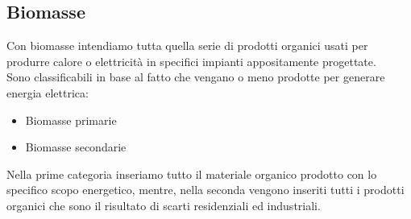\subsection{Biomasse}
Con biomasse intendiamo tutta quella serie di prodotti organici usati per produrre calore o elettricità in specifici impianti appositamente progettate.\\
Sono classificabili in base al fatto che vengano o meno prodotte per generare energia elettrica\cite{IRENA}:
\begin{itemize}
    \item Biomasse primarie
    \item Biomasse secondarie
\end{itemize}
\noindent
Nella prime categoria inseriamo tutto il materiale organico prodotto con lo specifico scopo energetico, mentre, nella seconda vengono inseriti tutti i prodotti organici che sono il risultato di scarti residenziali ed industriali.

